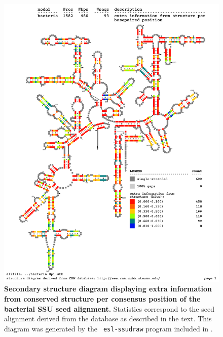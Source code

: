 \begin{figure}
\begin{center}
\includegraphics[width=5.5in]{../../seeds/ss-diagrams/bacteria-0p1-struct}
\end{center}
\caption[Secondary structure diagram displaying extra information 
  from conserved structure per consensus position of the bacterial SSU seed
  alignment]{\textbf{Secondary structure diagram displaying extra
  information from conserved structure per consensus position of the bacterial SSU seed
  alignment.} Statistics correspond to the  seed
  alignment derived from the  database \cite{CannoneGutell02}
  as described in the text. This diagram was generated by the {\tt
  esl-ssudraw} program included in .}
\label{fig:bacsinfo}
\end{figure}


